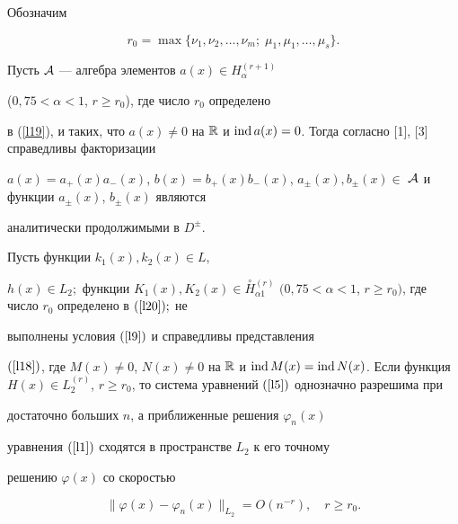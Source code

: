 Обозначим


\begin{equation}


\label{l20} r_0=\max\{\nu_1,\nu_2,\dotsc,\nu_m;\;


\mu_1,\mu_1,\dotsc,\mu_s\}.


\end{equation}





Пусть ${\cal A}$ --- алгебра элементов $a(x) \in H_\alpha^{(r+1)}$


($0{,}75<\alpha<1$, $r\geqslant r_0$), где число $r_0$ определено


в (\ref{l19}), и таких, что $a(x)\neq 0$ на $\Bbb R$ и $\ind


a(x)=0$. Тогда согласно [1], [3] справедливы факторизации


$a(x)=a_+(x)a_-(x)$, $b(x)=b_+(x)b_-(x)$, $a_\pm(x), 


b_\pm(x)\in$ ${\cal A}$ и функции $a_\pm(x)$, $b_\pm(x)$ являются


аналитически продолжимыми в $D^\pm$.








\begin{thm}


Пусть функции $k_1(x),  k_2(x) \in L$,


$h(x) \in L_2;$ функции $K_1(x),  K_2(x) \in


\overset{\circ}{H}{}^{(r)}_{\alpha1}$ $(0{,}75<\alpha<1$, $r\geqslant


r_0)$, где число $r_0$ определено в $(\ref{l20});$ не


выполнены условия $(\ref{l9})$ и справедливы представления


$(\ref{l18})$, где $M(x)\neq 0$, $N(x)\neq 0$ на $\Bbb R$ и $\ind 


M(x)=\ind N(x)$. Если функция $H(x) \in L_2^{(r)}$, $r\geqslant


r_0$, то система уравнений $(\ref{l5})$ однозначно разрешима при


достаточно больших $n$, а приближенные решения $\varphi_n(x)$


уравнения $(\ref{l1})$ сходятся в пространстве $L_2$ к его точному


решению $\varphi(x)$ со скоростью


\begin{equation}


\label{l21} \|\varphi(x)-\varphi_n(x)\|_{L_2}=O(n^{-r}), \quad


r\geqslant r_0.


\end{equation}


\end{thm}








